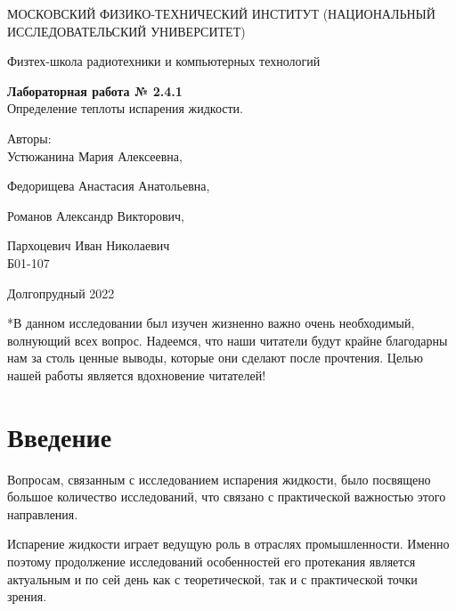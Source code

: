 \documentclass[a4paper,10pt]{article} %
\date{\today}
\begin{document}
\begin{titlepage}
	\begin{center}
		{\large МОСКОВСКИЙ ФИЗИКО-ТЕХНИЧЕСКИЙ ИНСТИТУТ (НАЦИОНАЛЬНЫЙ ИССЛЕДОВАТЕЛЬСКИЙ УНИВЕРСИТЕТ)}
	\end{center}
	\begin{center}
		{\large Физтех-школа радиотехники и компьютерных технологий}
	\end{center}
	
	
	\vspace{4cm}
	{\huge
		\begin{center}
			{\bf Лабораторная работа № 2.4.1}\\
			 Определение теплоты испарения жидкости.
		\end{center}
	}
	\vspace{3cm}
	\begin{flushright}
		{\LARGE Авторы:\\ Устюжанина Мария Алексеевна,

		Федорищева Анастасия Анатольевна, 

		Романов Александр Викторович, 

		Пархоцевич Иван Николаевич\\
			\vspace{0.3cm}
			Б01-107}
	\end{flushright}
	\vspace{4.5 cm}
	\begin{center}
		Долгопрудный 2022

	\vspace{1 cm}

		 *В данном исследовании был изучен жизненно важно очень необходимый, волнующий всех вопрос. Надеемся, что наши читатели будут крайне благодарны нам за столь ценные выводы, которые они сделают после прочтения. 
		 Целью нашей работы является вдохновение читателей!

	\end{center}
\end{titlepage}

\section{Введение}

Вопросам, связанным с исследованием испарения жидкости, было посвящено большое количество исследований, что связано с практической важностью этого направления. 

Испарение жидкости играет ведущую роль в отраслях промышленности. Именно поэтому продолжение исследований особенностей его протекания является актуальным и по сей день как с теоретической, так и с практической точки зрения.
\end{document}
